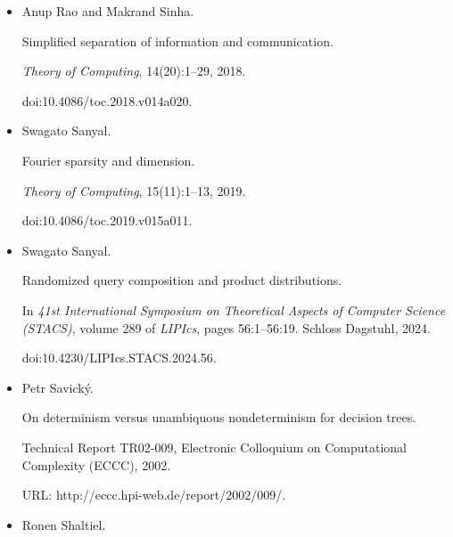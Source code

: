 \documentclass[10pt,a4paper]{article}
\begin{document}
\begin{itemize}
In \emph{2014 IEEE Conference on Computational Complexity (CCC)},
pages 144–154. IEEE Computer Society, 2014.


doi:10.1109/CCC.2014.22.





\item[] 
[47]

Anup Rao and Makrand Sinha.


Simplified separation of information and communication.


\emph{Theory of Computing}, 14(20):1–29, 2018.


doi:10.4086/toc.2018.v014a020.





\item[] 
[48]

Swagato Sanyal.


Fourier sparsity and dimension.


\emph{Theory of Computing}, 15(11):1–13, 2019.


doi:10.4086/toc.2019.v015a011.





\item[] 
[49]

Swagato Sanyal.


Randomized query composition and product distributions.


In \emph{41st International Symposium on Theoretical Aspects of
Computer Science (STACS)}, volume 289 of \emph{LIPIcs}, pages 56:1–56:19.
Schloss Dagstuhl, 2024.


doi:10.4230/LIPIcs.STACS.2024.56.





\item[] 
[50]

Petr Savický.


On determinism versus unambiquous nondeterminism for decision trees.


Technical Report TR02-009, Electronic Colloquium on Computational
Complexity (ECCC), 2002.


URL: http://eccc.hpi-web.de/report/2002/009/.





\item[] 
[51]

Ronen Shaltiel.



\end{itemize}
\end{document}
